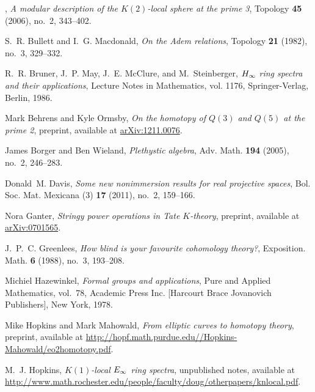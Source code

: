 \documentclass{rs}
\theoremstyle{definition}
\theoremstyle{remark}
\begin{document}
\begin{thebibliography}
\bysame, \emph{A modular description of the {$K(2)$}-local sphere at the prime
  3}, Topology \textbf{45} (2006), no.~2, 343--402. 

S.~R. Bullett and I.~G. Macdonald, \emph{On the {A}dem relations}, Topology
  \textbf{21} (1982), no.~3, 329--332. 

R.~R. Bruner, J.~P. May, J.~E. McClure, and M.~Steinberger, \emph{{$H\sb \infty
  $} ring spectra and their applications}, Lecture Notes in Mathematics, vol.
  1176, Springer-Verlag, Berlin, 1986. 

Mark Behrens and Kyle Ormsby, \emph{On the homotopy of ${Q}(3)$ and ${Q}(5)$ at
  the prime 2}, preprint, available at
  \href{http://arxiv.org/abs/1211.0076}{arXiv:1211.0076}.

James Borger and Ben Wieland, \emph{Plethystic algebra}, Adv. Math.
  \textbf{194} (2005), no.~2, 246--283. 

Donald~M. Davis, \emph{Some new nonimmersion results for real projective
  spaces}, Bol. Soc. Mat. Mexicana (3) \textbf{17} (2011), no.~2, 159--166.

Nora Ganter, \emph{Stringy power operations in {T}ate ${K}$-theory}, preprint,
  available at \href{http://arxiv.org/abs/math/0701565}{arXiv:0701565}.

J.~P.~C. Greenlees, \emph{How blind is your favourite cohomology theory?},
  Exposition. Math. \textbf{6} (1988), no.~3, 193--208. 

Michiel Hazewinkel, \emph{Formal groups and applications}, Pure and Applied
  Mathematics, vol.~78, Academic Press Inc. [Harcourt Brace Jovanovich
  Publishers], New York, 1978. 

Mike Hopkins and Mark Mahowald, \emph{From elliptic curves to homotopy theory},
  preprint, available at
  \href{http://hopf.math.purdue.edu//Hopkins-Mahowald/eo2homotopy.pdf}{http://hopf.math.purdue.edu//Hopkins-Mahowald/eo2homotopy.pdf}.

M.~J. Hopkins, \emph{{$K(1)$}-local {$E\sb \infty $} ring spectra}, unpublished
  notes, available at
  \href{http://www.math.rochester.edu/people/faculty/doug/otherpapers/knlocal.pdf}{http://\linebreak www.math.rochester.edu/people/faculty/doug/otherpapers/knlocal.pdf}.


\end{thebibliography}
\end{document}
